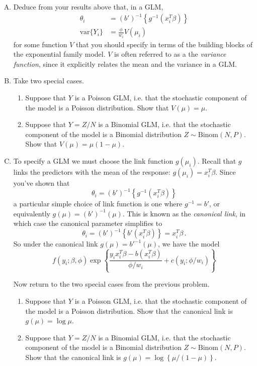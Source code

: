 \documentclass{mynotes}
\begin{document}
\begin{enumerate}[(A)]

\item Deduce from your results above that, in a GLM,
 $$
\begin{aligned}
\theta_i &= (b')^{-1} \left\{g^{-1}(x_i^T \beta) \right\} \\
\mbox{var} \{ Y_i \} &= \frac{\phi}{w_i} V(\mu_i)
\end{aligned}
$$
for some function $V$ that you should specify in terms of the building blocks of the exponential family model.  $V$ is often referred to as a the \emph{variance function}, since it explicitly relates the mean and the variance in a GLM.  

\item Take two special cases.  
\begin{enumerate}[(1)]
\item Suppose that $Y$ is a Poisson GLM, i.e. that the stochastic component of the model is a Poisson distribution.  Show that $V(\mu) = \mu$.
\item Suppose that $Y = Z/N$ is a Binomial GLM, i.e. that the stochastic component of the model is a Binomial distribution $Z \sim \mbox{Binom}(N, P)$.  Show that $V(\mu) = \mu(1-\mu)$.  
\end{enumerate}

\item To specify a GLM we must choose the link function $g(\mu_i)$.  Recall that $g$ links the predictors with the mean of the response: $g(\mu_i) = x_i^T \beta$.  Since you've shown that
$$
\theta_i = (b')^{-1} \left\{g^{-1}(x_i^T \beta) \right\}
$$
a particular simple choice of link function is one where $g^{-1} = b'$, or equivalently $g(\mu) = (b')^{-1}(\mu)$.  This is known as the \textit{canonical link}, in which case the canonical parameter simplifies to
$$
\theta_i = (b')^{-1} \left\{b'(x_i^T \beta) \right\} = x_i^T \beta \, .
$$
So under the canonical link $g(\mu) = b'^{-1}(\mu)$, we have the model
$$
f(y_i; \beta, \phi) \exp \left\{ \frac{y_i x_i^T \beta - b(x_i^T \beta)}{\phi/w_i} + c(y_i; \phi/w_i)   \right \}
$$

Now return to the two special cases from the previous problem.
\begin{enumerate}[(1)]
\item Suppose that $Y$ is a Poisson GLM, i.e. that the stochastic component of the model is a Poisson distribution. Show that the canonical link is $g(\mu) = \log \mu$.  
\item Suppose that $Y = Z/N$ is a Binomial GLM, i.e. that the stochastic component of the model is a Binomial distribution $Z \sim \mbox{Binom}(N, P)$.   Show that the canonical link is $g(\mu) = \log \left\{ \mu/(1-\mu) \right\}$.  
\end{enumerate}

\end{enumerate}
\end{document}
